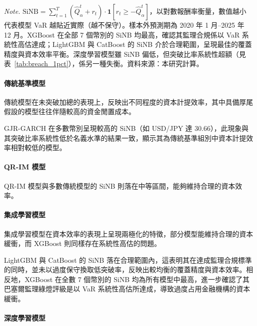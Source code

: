 \begin{table}[htbp]
    \vspace{3mm}
    \begin{minipage}{\textwidth}
        \fontsize{9pt}{13pt}\selectfont
        \textit{Note.} $\mathrm{SiNB} = \sum_{t=1}^{T}(\widehat{Q}_{\alpha}^{t} + r_t)\cdot\mathbf{1}[r_t \geq -\widehat{Q}_{\alpha}^{t}]$，以對數報酬率衡量，數值越小代表模型 VaR 越貼近實際（越不保守）。樣本外預測期為 2020 年 1 月--2025 年 12 月。XGBoost 在全部 7 個幣別的 SiNB 均最高，確認其監理合規係以 VaR 系統性高估達成；LightGBM 與 CatBoost 的 SiNB 介於合理範圍，呈現最佳的覆蓋精度與資本效率平衡。深度學習模型雖 SiNB 偏低，但突破比率系統性超額（見表~\ref{tab:breach_1pct}），係另一種失衡。資料來源：本研究計算。
    \end{minipage}
\end{table}

\paragraph{傳統基準模型}

傳統模型在未突破加總的表現上，反映出不同程度的資本計提效率，其中具備厚尾假設的模型往往伴隨較高的資金閒置成本。

GJR-GARCH 在多數幣別呈現較高的 SiNB（如 USD/JPY 達 30.66），此現象與其突破比率系統性低於名義水準的結果一致，顯示其為傳統基準組別中資本計提效率相對較低的模型。

\paragraph{QR-IM 模型}

QR-IM 模型與多數傳統模型的 SiNB 則落在中等區間，能夠維持合理的資本效率。

\paragraph{集成學習模型}

集成學習模型在資本效率的表現上呈現兩極化的特徵，部分模型能維持合理的資本緩衝，而 XGBoost 則同樣存在系統性高估的問題。

LightGBM 與 CatBoost 的 SiNB 落在合理範圍內，這表明其在達成監理合規標準的同時，並未以過度保守換取低突破率，反映出較均衡的覆蓋精度與資本效率。相反地，XGBoost 在全數 7 個幣別的 SiNB 均為所有模型中最高，進一步確認了其巴塞爾監理綠燈評級是以 VaR 系統性高估所達成，導致過度占用金融機構的資本緩衝。

\paragraph{深度學習模型}

